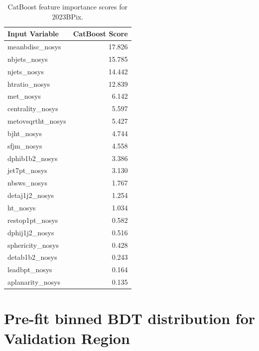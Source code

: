 \documentclass[twoside]{article}
\begin{document}
\begin{table}[htbp]
\centering
\begin{tabular}{l r}
\hline
\textbf{Input Variable} & \textbf{CatBoost Score} \\
\hline
meanbdisc\_nosys     & 17.826 \\
nbjets\_nosys        & 15.785 \\
njets\_nosys         & 14.442 \\
htratio\_nosys       & 12.839 \\
met\_nosys           & 6.142  \\
centrality\_nosys    & 5.597  \\
metovsqrtht\_nosys   & 5.427  \\
bjht\_nosys          & 4.744  \\
sfjm\_nosys          & 4.558  \\
dphib1b2\_nosys      & 3.386  \\
jet7pt\_nosys        & 3.130  \\
nbsws\_nosys         & 1.767  \\
detaj1j2\_nosys      & 1.254  \\
ht\_nosys            & 1.034  \\
restop1pt\_nosys     & 0.582  \\
dphij1j2\_nosys      & 0.516  \\
sphericity\_nosys    & 0.428  \\
detab1b2\_nosys      & 0.243  \\
leadbpt\_nosys       & 0.164  \\
aplanarity\_nosys    & 0.135  \\
\hline
\end{tabular}
\caption{CatBoost feature importance scores for 2023BPix.}
\label{tab:catboost_scores_2023bpix}
\end{table}


\section{Pre-fit binned BDT distribution for Validation Region}
\label{sec:prefit_vr}
\end{document}
